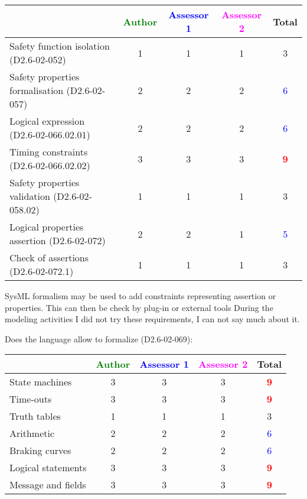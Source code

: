 \begin{tabular}{|l | c | c | c | c|}
\hline
& \textcolor{green}{Author} & \textcolor{blue}{Assessor 1} & \textcolor{magenta}{Assessor 2} & Total \\
\hline 
Safety function isolation (D2.6-02-052)  & 1   & 1   & 1    & 3    \\
\hline 
Safety properties formalisation (D2.6-02-057)  &2 & 2   & 2     & \textcolor{blue}{6} \\
\hline
Logical expression (D2.6-02-066.02.01)  &2 & 2   & 2   & \textcolor{blue}{6} \\
\hline
Timing constraints (D2.6-02-066.02.02)  &3 & 3    & 3   & \textcolor{red}{\textbf{9}} \\
\hline
Safety properties validation (D2.6-02-058.02)  &1 & 1   & 1   & 3    \\
\hline
Logical properties assertion (D2.6-02-072)  &2 & 2   & 1    & \textcolor{blue}{5} \\
\hline
Check  of assertions (D2.6-02-072.1)  &1 & 1   & 1    & 3     \\
\hline
\end{tabular}
\begin{author_comment}
SysML formalism may be used to add constraints representing assertion
or properties. This can then be check by plug-in or external tools
During the modeling activities I did not try these requirements, I can
not say much about it.
\end{author_comment}
Does the language allow to  formalize (D2.6-02-069):

\begin{tabular}{|l | c | c | c | c|}
\hline
& \textcolor{green}{Author} & \textcolor{blue}{Assessor 1} & \textcolor{magenta}{Assessor 2} & Total \\
\hline 
State machines  &3 & 3   & 3   & \textcolor{red}{\textbf{9}} \\
\hline
Time-outs  &3 & 3   & 3   & \textcolor{red}{\textbf{9}} \\
\hline
Truth tables  &1 &1 & 1   & 3     \\
\hline
Arithmetic  &2 & 2   & 2   & \textcolor{blue}{6} \\
\hline
Braking curves  &2 & 2   & 2   & \textcolor{blue}{6}  \\
\hline
Logical statements &3 & 3   & 3   & \textcolor{red}{\textbf{9}}  \\
\hline
Message and fields &3 & 3   &3 & \textcolor{red}{\textbf{9}}  \\
\hline
\end{tabular}

